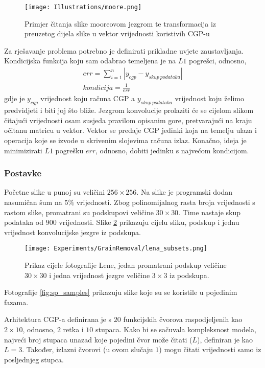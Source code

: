 \begin{figure}
	\centering
	\texttt{[image: Illustrations/moore.png]}
	\caption{Primjer čitanja slike mooreovom jezgrom te transformacija iz preuzetog dijela slike u vektor vrijednosti koristivih CGP-u}
	\label{fig:moore_example}
\end{figure}

Za rješavanje problema potrebno je definirati prikladne uvjete zaustavljanja.
Kondicijska funkcija koju sam odabrao temeljena je na $L1$ pogrešci, odnosno,
\begin{gather*}
err = \sum_{i=1}^{n} |y_{cgp} - y_{skup\ podataka}| \\
kondicija = \frac{1}{err}
\end{gather*}
gdje je $y_{cgp}$ vrijednost koju računa CGP a $y_{skup\ podataka}$ vrijednost koju želimo predvidjeti i biti joj što bliže.
Jezgrom konvolucije prolaziti će se cijelom slikom čitajući vrijednosti osam susjeda pravilom opisanim gore, pretvarajući na kraju očitanu matricu u vektor.
Vektor se predaje CGP jedinki koja na temelju ulaza i operacija koje se izvode u skrivenim slojevima računa izlaz.
Konačno, ideja je minimizirati $L1$ pogrešku $err$, odnosno, dobiti jedinku s najvećom kondicijom.

\subsubsection{Postavke}
Početne slike u punoj su veličini $256 \times 256$.
Na slike je programski dodan nasumičan šum na $5\%$ vrijednosti.
Zbog polinomijalnog rasta broja vrijednosti s rastom slike, promatrani su podskupovi veličine $30 \times 30$.
Time nastaje skup podataka od $900$ vrijednosti.
Slike \ref{fig:lena_subsets} prikazuju cijelu sliku, podskup i jednu vrijednost konvolucijske jezgre iz podskupa.

\begin{figure}
	\centering
	\texttt{[image: Experiments/GrainRemoval/lena\_subsets.png]}
	\caption{Prikaz cijele fotografije Lene, jedan promatrani podskup veličine $30 \times 30$ i jedna vrijednost jezgre veličine $3 \times 3$ iz podskupa.}
	\label{fig:lena_subsets}
\end{figure}

Fotografije \ref{fig:sp_samples} prikazuju slike koje su se koristile u pojedinim fazama.

Arhitektura CGP-a definirana je s $20$ funkcijskih čvorova raspodjeljenih kao $2 \times 10$, odnosno, $2$ retka i $10$ stupaca.
Kako bi se sačuvala kompleksnost modela, najveći broj stupaca unazad koje pojedini čvor može čitati ($L$), definiran je kao $L = 3$.
Također, izlazni čvorovi (u ovom slučaju $1$) mogu čitati vrijednosti samo iz posljednjeg stupca.


